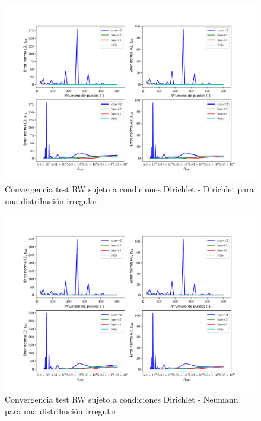 \begin{figure}
    \centering
    \includegraphics[width=1\textwidth]{./Imagenes/06/comparacion_shp_irreg/RW_irreg_type-2_caso-1_direct_dgesv-lapack-blas_sme-v2_lme-v2_lme-v1_fwls.pdf}
    \caption{Convergencia test RW sujeto a condiciones Dirichlet - Dirichlet para una distribución irregular} \label{fig:RW_caso-1_conv}
\end{figure}
\begin{figure}
    \centering
    \includegraphics[width=1\textwidth]{./Imagenes/06/comparacion_shp_irreg/RW_irreg_type-2_caso-2_direct_dgesv-lapack-blas_sme-v2_lme-v2_lme-v1_fwls.pdf}
    \caption{Convergencia test RW sujeto a condiciones Dirichlet - Neumann para una distribución irregular} \label{fig:RW_caso-2_conv}
\end{figure}
